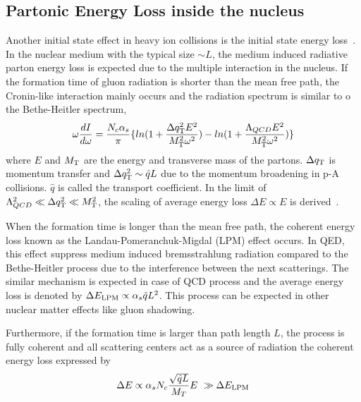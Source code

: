 \subsection{Partonic Energy Loss inside the nucleus}
\label{sec_2_eloss}
Another initial state effect in heavy ion collisions is the initial state energy loss~\cite{bib_paeloss}. 
In the nuclear medium with the typical size $\sim L$, the medium induced radiative parton energy loss is expected due to the multiple interaction in the nucleus. 
If the formation time of gluon radiation is shorter than the mean free path, the Cronin-like interaction mainly occurs and the radiation spectrum is similar to o the Bethe-Heitler spectrum, 
\begin{equation}
	\omega\frac{dI}{d\omega} = \frac{N_{c}\alpha_{s}}{\pi}\{  ln(1+\frac{\Delta q_{\rm{T}}^{2}E^{2}}{M_{\rm{T}}^{2} \omega^{2} }) -ln(1+\frac{\Lambda_{QCD}E^{2}}{M_{\rm{T}}^{2}\omega^{2}})    \}
\end{equation}
 where $E$ and $M_{\rm{T}}$ are the energy and transverse mass of the partons. 
 $\Delta q_{\rm{T}}$ is momentum transfer and $\Delta q_{\rm{T}}^{2}\sim\hat{q}L$ due to the momentum broadening in p-A collisions. 
$\hat{q}$ is called the transport coefficient.
In the limit of $\Lambda_{QCD} ^{2} \ll \Delta q_{\rm{T}}^{2} \ll M_{\rm{T}}^{2}$, the scaling of average energy loss $\Delta E \propto E$ is derived~\cite{bib_deltaescale}.       

When the formation time is longer than the mean free path, the coherent energy loss known as the Landau-Pomeranchuk-Migdal (LPM) effect occurs. 
In QED, this effect suppress medium induced bremsstrahlung radiation compared to the Bethe-Heitler process due to the interference between the next scatterings. 
The similar mechanism is expected in case of QCD process and the average energy loss is denoted by  $\Delta E_{\rm{LPM}} \propto \alpha_{s} \hat{q} L^{2}$.
This process can be expected in other nuclear matter effects like gluon shadowing. 

Furthermore, if the formation time is larger than path length $L$, the process is fully coherent and all scattering centers act as a source of radiation the coherent energy loss expressed by
\begin{equation}
	\Delta E \propto \alpha_{s}N_{c}\frac{\sqrt{\hat{q}L}}{M_{T}}E  ~ \gg \Delta E_{\rm{LPM}}
\end{equation}


